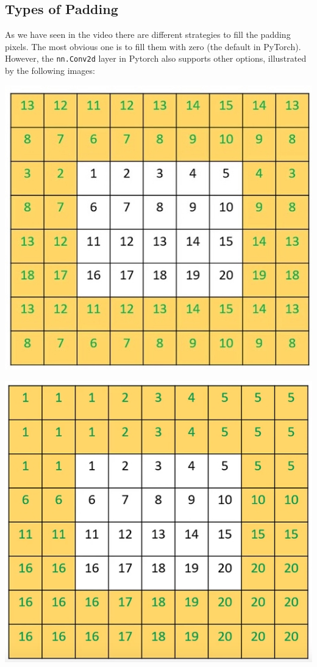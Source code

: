\subsection{Types of Padding}

As we have seen in the video there are different strategies to fill the padding pixels. The most obvious one is to fill them with zero (the default in PyTorch). However, the \lstinline{nn.Conv2d} layer in Pytorch also supports other options, illustrated by the following images:

\includegraphics[width=0.75\linewidth]{img//cnn//depth/reflection-padding.jpeg}

\includegraphics[width=0.75\linewidth]{img//cnn//depth/replicatepadding.jpeg}

